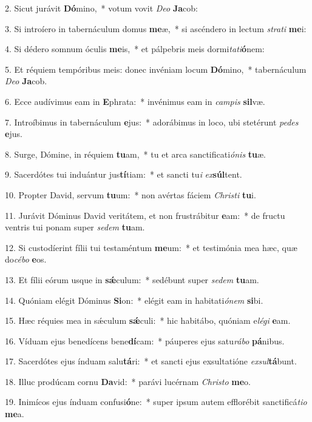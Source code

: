2. Sicut jurávit \textbf{Dó}mino,~*  votum vovit \textit{De}\textit{o} \textbf{Ja}cob:\

3. Si introíero in tabernáculum domus \textbf{me}æ,~*  si ascéndero in lectum \textit{stra}\textit{ti} \textbf{me}i:\

4. Si dédero somnum óculis \textbf{me}is,~*  et pálpebris meis dormi\textit{ta}\textit{ti}\textbf{ó}nem:\

5. Et réquiem tempóribus meis: donec invéniam locum \textbf{Dó}mino,~*  tabernáculum \textit{De}\textit{o} \textbf{Ja}cob.\

6. Ecce audívimus eam in \textbf{E}phrata:~*  invénimus eam in \textit{cam}\textit{pis} \textbf{sil}væ.\

7. Introíbimus in tabernáculum \textbf{e}jus:~*  adorábimus in loco, ubi stetérunt \textit{pe}\textit{des} \textbf{e}jus.\

8. Surge, Dómine, in réquiem \textbf{tu}am,~*  tu et arca sanctificati\textit{ó}\textit{nis} \textbf{tu}æ.\

9. Sacerdótes tui induántur jus\textbf{tí}tiam:~*  et sancti tu\textit{i} \textit{ex}\textbf{súl}tent.\

10. Propter David, servum \textbf{tu}um:~*  non avértas fáciem \textit{Chris}\textit{ti} \textbf{tu}i.\

11. Jurávit Dóminus David veritátem, et non frustrábitur \textbf{e}am:~*  de fructu ventris tui ponam super \textit{se}\textit{dem} \textbf{tu}am.\

12. Si custodíerint fílii tui testaméntum \textbf{me}um:~*  et testimónia mea hæc, quæ do\textit{cé}\textit{bo} \textbf{e}os.\

13. Et fílii eórum usque in \textbf{sǽ}culum:~*  sedébunt super \textit{se}\textit{dem} \textbf{tu}am.\

14. Quóniam elégit Dóminus \textbf{Si}on:~*  elégit eam in habitati\textit{ó}\textit{nem} \textbf{si}bi.\

15. Hæc réquies mea in sǽculum \textbf{sǽ}culi:~*  hic habitábo, quóniam e\textit{lé}\textit{gi} \textbf{e}am.\

16. Víduam ejus benedícens bene\textbf{dí}cam:~*  páuperes ejus satu\textit{rá}\textit{bo} \textbf{pá}nibus.\

17. Sacerdótes ejus índuam salu\textbf{tá}ri:~*  et sancti ejus exsultatióne \textit{ex}\textit{sul}\textbf{tá}bunt.\

18. Illuc prodúcam cornu \textbf{Da}vid:~*  parávi lucérnam \textit{Chris}\textit{to} \textbf{me}o.\

19. Inimícos ejus índuam confusi\textbf{ó}ne:~*  super ipsum autem efflorébit sanctificá\textit{ti}\textit{o} \textbf{me}a.\

